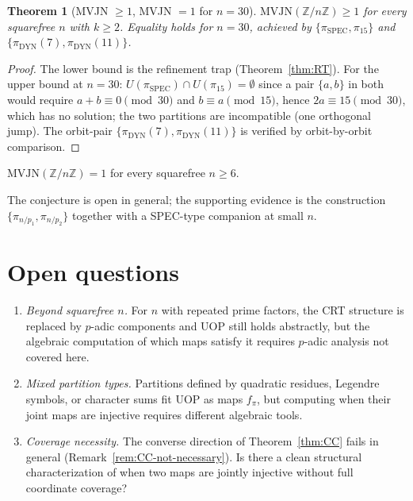 \documentclass[11pt,reqno]{amsart}
\theoremstyle{plain}
\newtheorem{theorem}{Theorem}
\theoremstyle{definition}
\newcommand{\Z}{\mathbb{Z}}
\newcommand{\Zn}{\Z/n\Z}
\newcommand{\DYN}{\mathrm{DYN}}
\newcommand{\SPEC}{\mathrm{SPEC}}
\begin{document}
\begin{theorem}[MVJN $\geq 1$, MVJN $= 1$ for $n=30$] \label{thm:MVJN}
$\mathrm{MVJN}(\Zn) \geq 1$ for every squarefree $n$ with $k \geq 2$. Equality holds for $n = 30$, achieved by $\{\pi_{\SPEC}, \pi_{15}\}$ and $\{\pi_{\DYN}(7), \pi_{\DYN}(11)\}$.
\end{theorem}

\begin{proof}
The lower bound is the refinement trap (Theorem~\ref{thm:RT}). For the upper bound at $n = 30$: $U(\pi_{\SPEC}) \cap U(\pi_{15}) = \emptyset$ since a pair $\{a,b\}$ in both would require $a + b \equiv 0 \pmod{30}$ and $b \equiv a \pmod{15}$, hence $2a \equiv 15 \pmod{30}$, which has no solution; the two partitions are incompatible (one orthogonal jump). The orbit-pair $\{\pi_{\DYN}(7), \pi_{\DYN}(11)\}$ is verified by orbit-by-orbit comparison.
\end{proof}

\begin{conjecture} \label{conj:MVJN}
$\mathrm{MVJN}(\Zn) = 1$ for every squarefree $n \geq 6$.
\end{conjecture}

The conjecture is open in general; the supporting evidence is the construction $\{\pi_{n/p_1}, \pi_{n/p_2}\}$ together with a SPEC-type companion at small $n$.

\section{Open questions} \label{sec:open}

\begin{enumerate}[label=(\alph*)]
\item \emph{Beyond squarefree $n$.} For $n$ with repeated prime factors, the CRT structure is replaced by $p$-adic components and UOP still holds abstractly, but the algebraic computation of which maps satisfy it requires $p$-adic analysis not covered here.
\item \emph{Mixed partition types.} Partitions defined by quadratic residues, Legendre symbols, or character sums fit UOP as maps $f_{\pi}$, but computing when their joint maps are injective requires different algebraic tools.
\item \emph{Coverage necessity.} The converse direction of Theorem~\ref{thm:CC} fails in general (Remark~\ref{rem:CC-not-necessary}). Is there a clean structural characterization of when two maps are jointly injective without full coordinate coverage?
\end{enumerate}
\end{document}
